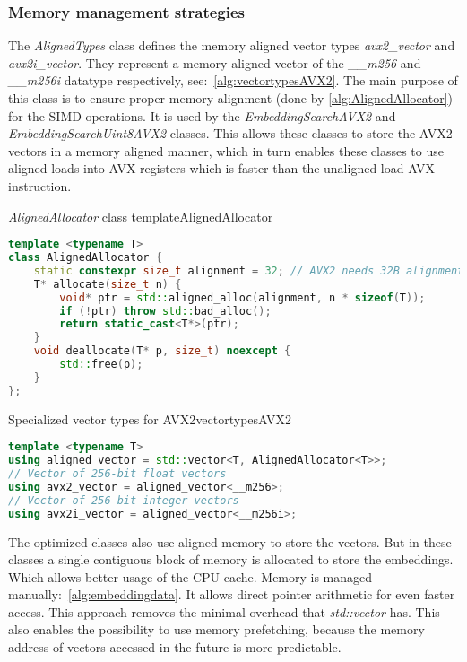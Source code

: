 \subsubsection{Memory management strategies}
\label{memorymanagement}
The \textit{AlignedTypes} class defines the memory aligned vector types \textit{avx2\_vector} and \textit{avx2i\_vector}. They represent a memory aligned vector of the \textit{\_\_m256} and \textit{\_\_m256i} datatype respectively, see:~\autoref{alg:vectortypesAVX2}. The main purpose of this class is to ensure proper memory alignment (done by \autoref{alg:AlignedAllocator}) for the SIMD operations. It is used by the \textit{EmbeddingSearchAVX2} and \textit{EmbeddingSearchUint8AVX2} classes. This allows these classes to store the AVX2 vectors in a memory aligned manner, which in turn enables these classes to use aligned loads into AVX registers which is faster than the unaligned load AVX instruction.

\begin{algorithm}{\textit{AlignedAllocator} class template}{AlignedAllocator}
    \begin{lstlisting}[language=C++]
template <typename T>
class AlignedAllocator {
    static constexpr size_t alignment = 32; // AVX2 needs 32B alignment
    T* allocate(size_t n) {
        void* ptr = std::aligned_alloc(alignment, n * sizeof(T));
        if (!ptr) throw std::bad_alloc();
        return static_cast<T*>(ptr);
    }
    void deallocate(T* p, size_t) noexcept {
        std::free(p);
    }
};
    \end{lstlisting}
\end{algorithm}

\begin{algorithm}{Specialized vector types for AVX2}{vectortypesAVX2}
    \begin{lstlisting}[language=C++]
template <typename T>
using aligned_vector = std::vector<T, AlignedAllocator<T>>;
// Vector of 256-bit float vectors
using avx2_vector = aligned_vector<__m256>;
// Vector of 256-bit integer vectors
using avx2i_vector = aligned_vector<__m256i>;
    \end{lstlisting}
\end{algorithm}

The optimized classes also use aligned memory to store the vectors. But in these classes a single contiguous block of memory is allocated to store the embeddings. Which allows better usage of the CPU cache. Memory is managed manually:~\autoref{alg:embeddingdata}. It allows direct pointer arithmetic for even faster access. This approach removes the minimal overhead that \textit{std::vector} has. This also enables the possibility to use memory prefetching, because the memory address of vectors accessed in the future is more predictable.

